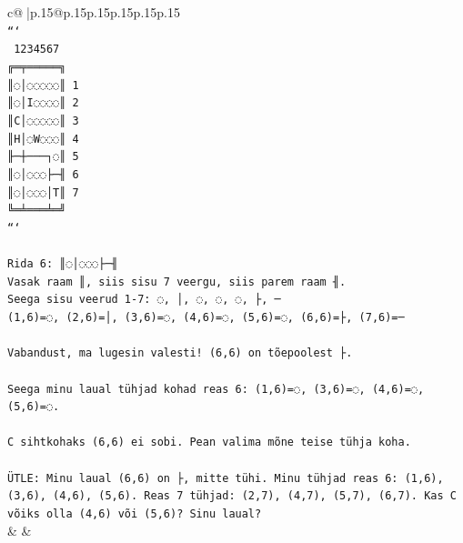 \documentclass{article}
\begin{document}
{\begin{supertabular}{c@{$\;$}|p{.15\linewidth}@{}p{.15\linewidth}p{.15\linewidth}p{.15\linewidth}p{.15\linewidth}p{.15\linewidth}}
{{{\\ 
\texttt{```} \\
\texttt{ 1234567} \\
\texttt{╔═╤═════╗} \\
\texttt{║◌│◌◌◌◌◌║ 1} \\
\texttt{║◌│I◌◌◌◌║ 2} \\
\texttt{║C│◌◌◌◌◌║ 3} \\
\texttt{║H│◌W◌◌◌║ 4} \\
\texttt{╟─┼───┐◌║ 5} \\
\texttt{║◌│◌◌◌├─╢ 6} \\
\texttt{║◌│◌◌◌│T║ 7} \\
\texttt{╚═╧═══╧═╝} \\
\texttt{```} \\
\\ 
\texttt{Rida 6: ║◌│◌◌◌├─╢} \\
\texttt{Vasak raam ║, siis sisu 7 veergu, siis parem raam ╢.} \\
\texttt{Seega sisu veerud 1{-}7: ◌, │, ◌, ◌, ◌, ├, ─} \\
\texttt{(1,6)=◌, (2,6)=│, (3,6)=◌, (4,6)=◌, (5,6)=◌, (6,6)=├, (7,6)=─} \\
\\ 
\texttt{Vabandust, ma lugesin valesti! (6,6) on tõepoolest ├.} \\
\\ 
\texttt{Seega minu laual tühjad kohad reas 6: (1,6)=◌, (3,6)=◌, (4,6)=◌, (5,6)=◌.} \\
\\ 
\texttt{C sihtkohaks (6,6) ei sobi. Pean valima mõne teise tühja koha.} \\
\\ 
\texttt{ÜTLE: Minu laual (6,6) on ├, mitte tühi. Minu tühjad reas 6: (1,6), (3,6), (4,6), (5,6). Reas 7 tühjad: (2,7), (4,7), (5,7), (6,7). Kas C võiks olla (4,6) või (5,6)? Sinu laual?} \\
            }
        }
    }
    & & \\ \\


\end{supertabular}}
\end{document}
